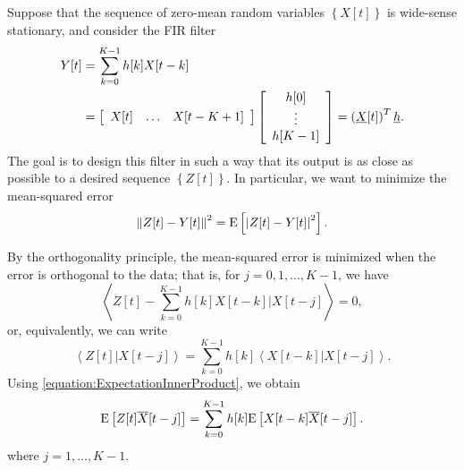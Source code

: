 Suppose that the sequence of zero-mean random variables $\left\{ X[t] \right\}$ is wide-sense stationary, and consider the FIR filter
\begin{equation*}
\begin{split}
Y[t] &= \sum_{k=0}^{K-1} h[k] X[t - k] \\
&= \left[ \begin{array}{ccc} X[t] & \hdots & X[t-K+1] \end{array} \right]
\left[ \begin{array}{c} h[0] \\ \vdots \\ h[K-1] \end{array} \right]
= \left( \underline{X}[t] \right)^T \underline{h} .
\end{split}
\end{equation*}
The goal is to design this filter in such a way that its output is as close as possible to a desired sequence $\left\{ Z[t] \right\}$.
In particular, we want to minimize the mean-squared error
\begin{equation*}
\left\| Z[t] - Y[t] \right\|^2 = \mathrm{E} \left[ \left| Z[t] - Y[t] \right|^2 \right].
\end{equation*}

By the orthogonality principle, the mean-squared error is minimized when the error is orthogonal to the data; that is, for $j = 0, 1, \ldots, K-1$, we have
\begin{equation*}
\left\langle Z[t] - \sum_{k=0}^{K-1} h[k] X[t - k] \Big| X[t - j] \right\rangle = 0,
\end{equation*}
or, equivalently, we can write
\begin{equation*}
\left\langle Z[t] | X[t - j] \right\rangle
= \sum_{k=0}^{K-1} h[k] \left\langle X[t - k] | X[t - j] \right\rangle .
\end{equation*}
Using \eqref{equation:ExpectationInnerProduct}, we obtain
\begin{equation} \label{equation:WienerHopfConditions}
\mathrm{E} \left[ Z[t] \overline{X}[t - j] \right]
= \sum_{k=0}^{K-1} h[k] \mathrm{E} \left[ X[t - k] \overline{X}[t - j] \right] .
\end{equation}
where $j = 1, \ldots, K-1$.

